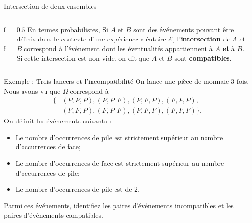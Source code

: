 \documentclass[nuit,charter,pied,handout]{BeamerJS}
\begin{document}
\begin{frame}[c]{Intersection de deux ensembles}
\pause
	\begin{columns}[c]
		\begin{column}{0.5\textwidth}
		\end{column}
		\pause
		\begin{column}{0.5\textwidth}
			En termes probabilistes, Si \(A\) et \(B\) sont des événements pouvant être définis dans le contexte d'une expérience aléatoire $\mathcal{E}$, l'\textbf{intersection} de \(A\) et \(B\) correspond à l'événement dont les éventualités appartiennent à \(A\) \textbf{et} à \(B\). Si cette intersection est non-vide, on dit que \(A\) et \(B\) sont \textbf{compatibles}.
		\end{column}
	\end{columns}
\end{frame}
\begin{frame}{Exemple : Trois lancers et l'incompatibilité}
	On lance une pièce de monnaie \num{3} fois. Nous avons vu que \(\Omega\) correspond à
	\begin{align*}
	\{&(P,P,P),(P,P,F),(P,F,P),(F,P,P),\\
	  &(F,F,P),(F,P,F),(P,F,F),(F,F,F)\}.
	\end{align*}
	\pause
	On définit les événements suivants :
	\begin{itemize}
		\item[\color{black}\(A=\)] Le nombre d'occurrences de pile est strictement supérieur au nombre d'occurrences de face; 
		\item[\color{black}\(B=\)] Le nombre d'occurrences de face est strictement supérieur au nombre d'occurrences de pile; 
		\item[\color{black}\(D=\)] Le nombre d'occurrences de pile est de \num{2}. 
	\end{itemize}
	\pause
	Parmi ces événements, identifiez les paires d'événements incompatibles et les paires d'événements compatibles.
\end{frame}
\end{document}
